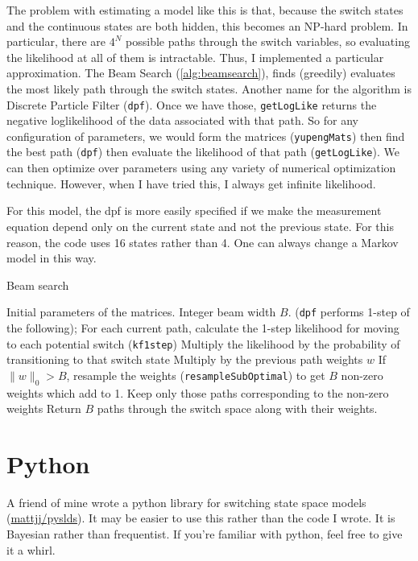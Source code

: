 \documentclass[11pt]{article}
\newcommand{\norm}[1]{\lVert #1 \rVert}
\begin{document}
The problem with estimating a model like this is that, because the
switch states and the continuous states are both hidden, this becomes
an NP-hard problem. In particular, there are $4^N$ possible paths
through the switch variables, so evaluating the likelihood at all of
them is intractable. Thus, I implemented a particular
approximation. The Beam Search (\autoref{alg:beamsearch}), finds
(greedily) evaluates the most likely path through the switch
states. Another name for the algorithm is Discrete Particle Filter
(\texttt{dpf}). Once we have those, \texttt{getLogLike} returns the
negative 
loglikelihood of the data associated with that path. So for any
configuration of parameters, we would form the matrices
(\texttt{yupengMats}) then find the best path (\texttt{dpf}) then
evaluate the likelihood of that path (\texttt{getLogLike}). We can
then optimize over parameters using any variety of numerical
optimization technique. However, when I have tried this, I always get
infinite likelihood.

For this model, the dpf is more easily specified if we make the
measurement equation depend only on the current state and not the
previous state. For this reason, the code uses 16 states rather than
4. One can always change a Markov model in this way.

\begin{algorithm}[t!]
  \caption{Beam search\label{alg:beamsearch}}
  \begin{algorithmic}[1]
  Initial parameters of the matrices. Integer beam width $B$.
  \STATE (\texttt{dpf} performs 1-step of the following);
  \STATE For each current path, calculate the 1-step likelihood for
  moving to each potential switch (\texttt{kf1step})\;
  \STATE Multiply the likelihood by the probability of transitioning
  to that switch state\;
  \STATE Multiply by the previous path weights $w$\;
  \STATE If $\norm{w}_0>B$, resample the weights\;
  (\texttt{resampleSubOptimal}) to get $B$ non-zero weights which
  add to 1.\;
  \STATE Keep only those paths corresponding to the non-zero weights\;
  \ENDFOR
  \STATE Return $B$ paths through the switch space along with their weights.\;
\end{algorithmic}
\end{algorithm}


\section{Python}

A friend of mine wrote a python library for switching state space
models (\href{https://github.com/mattjj/pyslds}{mattjj/pyslds}). It
may be easier to use this rather than the code I wrote. It is Bayesian
rather than frequentist. If you're familiar with python, feel free to
give it a whirl.



\end{document}
